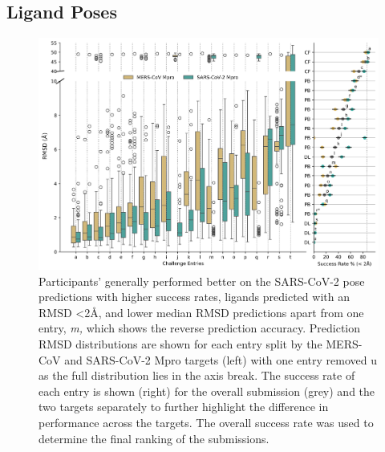 \documentclass[journal=jcim,manuscript=article]{achemso}
\begin{document}
\subsection{Ligand Poses}

\begin{figure}
    \includegraphics[scale=0.15
    ]{04_figs_leaderboards/pose_comp.png}
  \caption{Participants' generally performed better on the SARS-CoV-2 pose predictions with higher success rates, ligands predicted with an RMSD \textless2Å, and lower median RMSD predictions apart from one entry, \textit{m,} which shows the reverse prediction accuracy. Prediction RMSD distributions are shown for each entry split by the MERS-CoV and SARS-CoV-2 Mpro targets (left) with one entry removed u as the full distribution lies in the axis break. The success rate of each entry is shown (right) for the overall submission (grey) and the two targets separately to further highlight the difference in performance across the targets. The overall success rate was used to determine the final ranking of the submissions.}
  \label{fgr:poses_leaderboard}
\end{figure}
\end{document}
